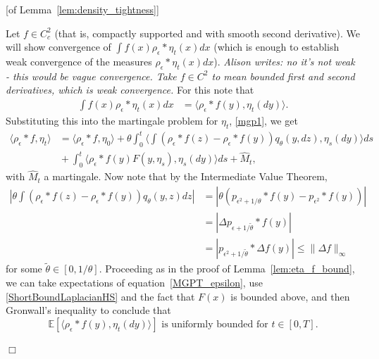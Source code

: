 \documentclass[12pt]{article}
\newenvironment {proof}{{\noindent\bf Proof }}{\hfill $\Box$ \medskip}
\def \tilde{\widetilde}
\newcommand{\IE}{\mathbb E}
\newcommand{\comment}[1]{{\color{blue} \it #1}}
\begin{document}
\begin{proof}[of Lemma~\ref{lem:density_tightness}]

    Let $f \in C_c^2$ (that is, compactly supported and with smooth second derivative).
    We will show convergence of $\int f(x) \rho_\epsilon * \eta_t(x) dx$ (which is enough to establish weak convergence of the measures $\rho_\epsilon * \eta_t(x) dx$).
    \comment{Alison writes: no it's not weak - this would be vague convergence. Take $f \in C^2$ to mean bounded first and second derivatives, which is weak convergence.}
    For this note that
    \begin{align*}
        \int f(x) \rho_\epsilon * \eta_t(x) dx
        &=
        \langle \rho_\epsilon * f(y), \eta_t(dy) \rangle .
    \end{align*}
    Substituting this into the martingale problem for $\eta_t$, \eqref{mgp1},
    we get
    \begin{align}
         \label{MGPT_epsilon}
    \langle \rho_{\epsilon} * f, \eta_t \rangle
        & = \nonumber 
        \langle \rho_{\epsilon} * f, \eta_0 \rangle
        +
        \theta \int_0^t
            \langle
                \int (\rho_{\epsilon} * f(z) - \rho_{\epsilon} * f(y)) q_\theta(y, dz) ,
                \eta_s(dy)
            \rangle
        ds
        \\ & {}
        +
        \int_0^t \langle \rho_\epsilon * f(y) F(y, \eta_s), \eta_s(dy) \rangle ds
        + \widehat{M}_t,
    \end{align}
    with $\widehat{M}_t$ a martingale. Now note that
    by the Intermediate Value Theorem,
    \begin{align}
        \label{ShortBoundLaplacianHS}
        \left| \theta \int (\rho_{\epsilon} * f(z) - \rho_{\epsilon} * f(y)) q_\theta(y,z) dz \right|
        &=
        \left| \theta( p_{\epsilon^2 + 1/\theta} * f(y) - p_{\epsilon^2} * f(y) ) \right| \nonumber
        \\ &=
        \left| \Delta p_{\epsilon+1/\tilde{\theta}} * f(y) \right| \nonumber
        \\ &=
        \left| p_{\epsilon^2 + 1/\tilde{\theta}} * \Delta f(y) \right|
        \leq
        \| \Delta f \|_{\infty}
    \end{align}
    for some $\tilde{\theta} \in [0,1/\theta]$.
    Proceeding as in the proof of Lemma~\ref{lem:eta_f_bound},
    we can take expectations of equation~\eqref{MGPT_epsilon},
    use \eqref{ShortBoundLaplacianHS} and the fact that $F(x)$ is bounded above,
    and then Gronwall's inequality to conclude that
    \[
        \IE\left[\langle \rho_{\epsilon} * f(y), \eta_t(dy) \rangle \right]
        \text{ is uniformly bounded for } t \in [0,T].
    \]


\end{proof}
\end{document}
